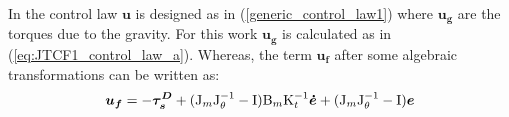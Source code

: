 \documentclass[journal]{IEEEtran}
\newcommand{\hl}[1]{\colorbox{yellow}{#1}}
\newcommand{\vectm}[1]{ { {\text #1} }}
\newcommand{\vects}[1]{{\boldsymbol {#1}}}
\begin{document}
In \cite{kugi2008passivity} the control law $\vects{u}$ is designed as in (\ref{generic_control_law1}) where $\vects{u_g}$ are the torques due to the gravity. For this work $\vects{u_g}$ is calculated as in (\ref{eq:JTCF1_control_law_a}). Whereas, the term $\vects{u_f}$ after some algebraic transformations can be written as:
%
%
\begin{equation}
\label{control_law_Kugi_2}
\vects{u_f} =  -\vects{\tau^D_s} + (\vectm{J_m} \vectm{J^{-1}_{\theta}} - \vectm{I}) \vectm{B_m} \vectm{K^{-1}_t} \vects{\dot{e}} + (\vectm{J_m} \vectm{J^{-1}_{\theta}} - \vectm{I}) \vects{e}
\end{equation}


%
%
%
%
\end{document}
